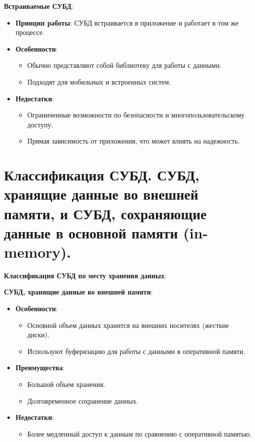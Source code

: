\documentclass[a4paper,12pt]{article}
\begin{document}
\textbf{Встраиваемые СУБД}:

\begin{itemize}
    \item \textbf{Принцип работы}: СУБД встраивается в приложение и работает в том же процессе.
    \item \textbf{Особенности}:
    \begin{itemize}
        \item Обычно представляют собой библиотеку для работы с данными.
        \item Подходят для мобильных и встроенных систем.
    \end{itemize}
    \item \textbf{Недостатки}:
    \begin{itemize}
        \item Ограниченные возможности по безопасности и многопользовательскому доступу.
        \item Прямая зависимость от приложения, что может влиять на надежность.
    \end{itemize}
\end{itemize}

\section{Классификация СУБД. СУБД, хранящие данные во внешней памяти, и СУБД, сохраняющие данные в основной памяти (in-memory).}

\textbf{Классификация СУБД по месту хранения данных}:

\textbf{СУБД, хранящие данные во внешней памяти}:

\begin{itemize}
    \item \textbf{Особенности}:
    \begin{itemize}
        \item Основной объем данных хранится на внешних носителях (жесткие диски).
        \item Используют буферизацию для работы с данными в оперативной памяти.
    \end{itemize}
    \item \textbf{Преимущества}:
    \begin{itemize}
        \item Большой объем хранения.
        \item Долговременное сохранение данных.
    \end{itemize}
    \item \textbf{Недостатки}:
    \begin{itemize}
        \item Более медленный доступ к данным по сравнению с оперативной памятью.
    \end{itemize}
\end{itemize}
\end{document}
